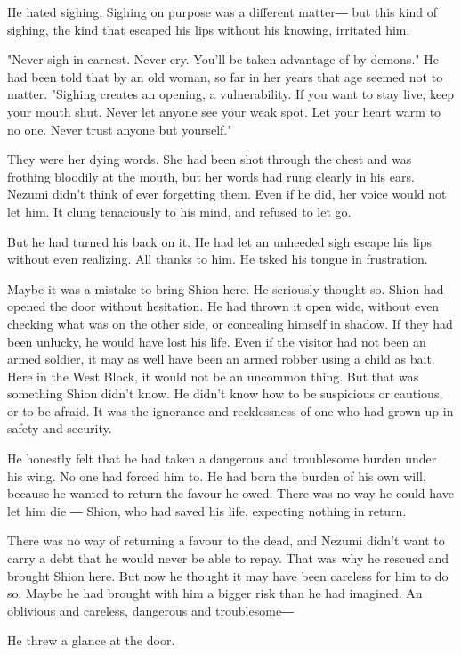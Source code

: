 He hated sighing. Sighing on purpose was a different matter― but this
kind of sighing, the kind that escaped his lips without his knowing,
irritated him.

"Never sigh in earnest. Never cry. You'll be taken advantage of by
demons." He had been told that by an old woman, so far in her years that
age seemed not to matter. "Sighing creates an opening, a vulnerability.
If you want to stay live, keep your mouth shut. Never let anyone see
your weak spot. Let your heart warm to no one. Never trust anyone but
yourself."

They were her dying words. She had been shot through the chest and was
frothing bloodily at the mouth, but her words had rung clearly in his
ears. Nezumi didn't think of ever forgetting them. Even if he did, her
voice would not let him. It clung tenaciously to his mind, and refused
to let go.

But he had turned his back on it. He had let an unheeded sigh escape his
lips without even realizing. All thanks to him. He tsked his tongue in
frustration.

Maybe it was a mistake to bring Shion here. He seriously thought so.
Shion had opened the door without hesitation. He had thrown it open
wide, without even checking what was on the other side, or concealing
himself in shadow. If they had been unlucky, he would have lost his
life. Even if the visitor had not been an armed soldier, it may as well
have been an armed robber using a child as bait. Here in the West Block,
it would not be an uncommon thing. But that was something Shion didn't
know. He didn't know how to be suspicious or cautious, or to be afraid.
It was the ignorance and recklessness of one who had grown up in safety
and security.

He honestly felt that he had taken a dangerous and troublesome burden
under his wing. No one had forced him to. He had born the burden of his
own will, because he wanted to return the favour he owed. There was no
way he could have let him die ― Shion, who had saved his life, expecting
nothing in return.

There was no way of returning a favour to the dead, and Nezumi didn't
want to carry a debt that he would never be able to repay. That was why
he rescued and brought Shion here. But now he thought it may have been
careless for him to do so. Maybe he had brought with him a bigger risk
than he had imagined. An oblivious and careless, dangerous and
troublesome―

He threw a glance at the door.

